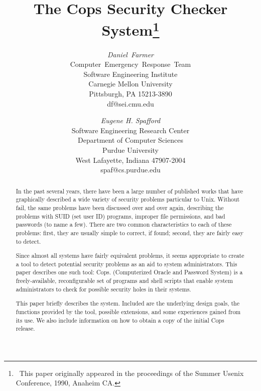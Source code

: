 



\title{\LARGE The {\sc Cops} Security Checker System\thanks{\ This paper originally
appeared in the proceedings of the Summer Usenix Conference, 1990,
Anaheim CA.} \\ }

\author{{\sl Daniel\ Farmer}\\
Computer\ Emergency\ Response\ Team\\
Software Engineering Institute\\
Carnegie Mellon University\\
Pittsburgh, PA 15213-3890\\
df@sei.cmu.edu\\
\and
{\sl Eugene H. Spafford} \\
Software Engineering Research Center \\
Department of Computer Sciences\\
Purdue University\\
West Lafayette, Indiana 47907-2004  \\
spaf@cs.purdue.edu}

\maketitle
\begin{abstract}

In the past several years, there have been a large number of published
works that have graphically described a wide variety of security
problems particular to {\sc Unix}.  Without fail, the same problems have
been discussed over and over again, describing the problems with SUID
(set user ID) programs, improper file permissions, and bad passwords
(to name a few).  There are two common characteristics to each of
these problems: first, they are usually simple to correct, if found;
second, they are fairly easy to detect.

Since almost all  systems have fairly equivalent problems,
it seems appropriate to create a tool to detect potential security
problems as an aid to system administrators.  This paper describes one such tool:
{\sc Cops}.   (Computerized Oracle and Password System) is a
freely-available, reconfigurable set of programs and shell scripts
that enable system administrators to check for possible security holes
in their  systems.

This paper briefly describes the  system.  Included are the
underlying design goals, the functions provided by the tool, possible
extensions, and some experiences gained from its use.  We also include
information on how to obtain a copy of the initial  {\sc Cops} release.
\end{abstract}


